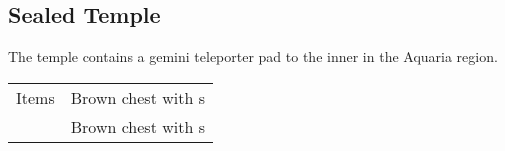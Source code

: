 \subsection{Sealed Temple}
\label{map:sealed_temple}

The temple contains a gemini teleporter pad to the inner  in the Aquaria region.

\noindent\begin{tabularx}{\textwidth}[l]{lX}
	Items
	& Brown chest with \nameref{item:cure_potion}s \\
	& Brown chest with \nameref{item:heal_potion}s
\end{tabularx}
